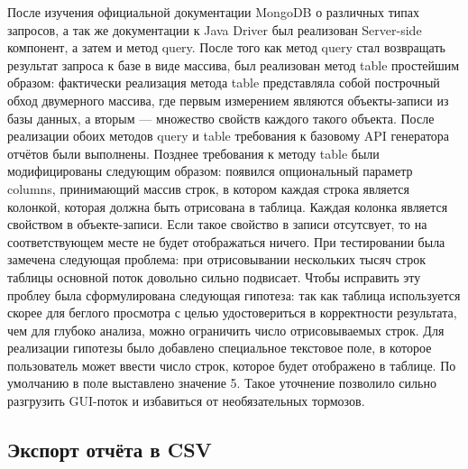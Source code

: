 \documentclass[12pt]{article}
\begin{document}
    После изучения официальной документации MongoDB о различных типах запросов, а так же документации к Java Driver был реализован Server-side
    компонент, а затем и метод query. После того как метод query стал возвращать результат запроса к базе в виде массива, был реализован
    метод table простейшим образом: фактически реализация метода table представляла собой построчный обход двумерного массива, где первым
    измерением являются объекты-записи из базы данных, а вторым --- множество свойств каждого такого объекта. После реализации обоих методов
    query и table требования к базовому API генератора отчётов были выполнены. Позднее требования к методу table были модифицированы
    следующим образом: появился опциональный параметр columns, принимающий массив строк, в котором каждая строка является колонкой, которая
    должна быть отрисована в таблица. Каждая колонка является свойством в объекте-записи. Если такое свойство в записи отсутсвует, то
    на соответствующем месте не будет отображаться ничего. При тестировании была замечена следующая проблема: при отрисовывании
    нескольких тысяч строк таблицы основной поток довольно сильно подвисает. Чтобы исправить эту проблеу была сформулирована следующая гипотеза:
    так как таблица используется скорее для беглого просмотра с целью удостовериться в корректности результата, чем для глубоко анализа,
    можно ограничить число отрисовываемых строк. Для реализации гипотезы было добавлено специальное текстовое поле, в которое пользователь
    может ввести число строк, которое будет отображено в таблице. По умолчанию в поле выставлено значение 5. Такое уточнение позволило сильно разгрузить GUI-поток
    и избавиться от необязательных тормозов.

    \subsection{Экспорт отчёта в CSV}
\end{document}
